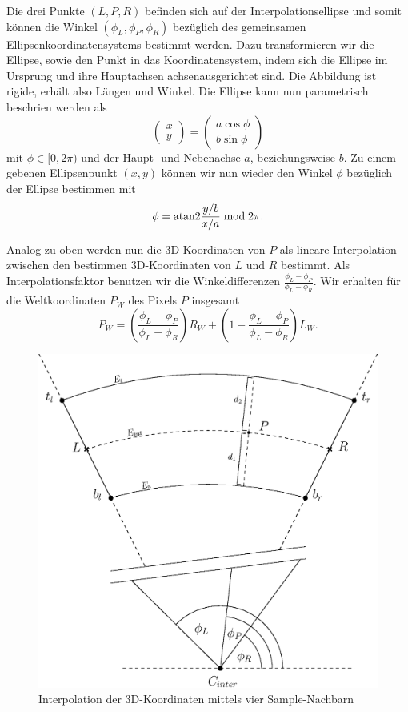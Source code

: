 Die drei Punkte $(L, P, R)$ befinden sich auf der Interpolationsellipse und somit können die  Winkel $(\phi_L, \phi_P, \phi_R)$ bezüglich des gemeinsamen Ellipsenkoordinatensystems bestimmt werden. Dazu transformieren wir die Ellipse, sowie den Punkt in das Koordinatensystem, indem sich die Ellipse im Ursprung und ihre Hauptachsen achsenausgerichtet sind. Die Abbildung ist rigide, erhält also Längen und Winkel. Die Ellipse kann nun parametrisch beschrien werden als
\[
\begin{pmatrix}x \\ y\end{pmatrix} = \begin{pmatrix}a\cos\phi \\
b\sin\phi\end{pmatrix}
\] %
mit $\phi \in [0, 2\pi)$ und der Haupt- und Nebenachse $a$, beziehungsweise $b$. Zu einem gebenen Ellipsenpunkt $(x,y)$ können wir nun wieder den Winkel $\phi$ bezüglich der Ellipse bestimmen mit
\[
\phi = \text{atan2} \frac{y/b}{x/a} \bmod 2\pi.
\] %

Analog zu oben werden nun die 3D-Koordinaten von $P$ als lineare Interpolation zwischen den bestimmen 3D-Koordinaten von $L$ und $R$ bestimmt. Als Interpolationsfaktor benutzen wir die Winkeldifferenzen
$\frac{\phi_L - \phi_P}{\phi_L - \phi_R}$. Wir erhalten für die Weltkoordinaten $P_W$ des Pixels $P$ insgesamt
\[
P_W = \left(\frac{\phi_L - \phi_P}{\phi_L - \phi_R}\right) R_W + \left(1 - \frac{\phi_L - \phi_P}{\phi_L - \phi_R}\right) L_W.
\]

\begin{figure}[!htb]
	\centering
	\includegraphics[scale=.6]{images/radialInterpolation.eps}
	\caption{Interpolation der 3D-Koordinaten mittels vier Sample-Nachbarn}
	\label{fig:radialInterpolation}
\end{figure}



